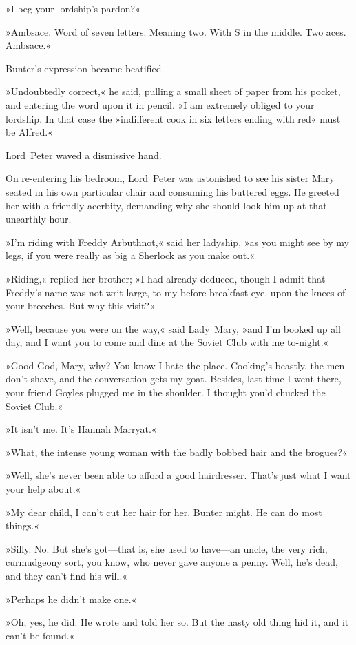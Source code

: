 »I beg your lordship's pardon?«

»Ambsace. Word of seven letters. Meaning two. With S in the middle. Two aces. Ambsace.«

Bunter's expression became beatified.

»Undoubtedly correct,« he said, pulling a small sheet of paper from his pocket, and entering the word upon it in pencil. »I am extremely obliged to your lordship. In that case the »indifferent cook in six letters ending with red« must be Alfred.«

Lord~Peter waved a dismissive hand.

\divider
On re-entering his bedroom, Lord~Peter was astonished to see his sister Mary seated in his own particular chair and consuming his buttered eggs. He greeted her with a friendly acerbity, demanding why she should look him up at that unearthly hour.

»I'm riding with Freddy Arbuthnot,« said her ladyship, »as you might see by my legs, if you were really as big a Sherlock as you make out.«

»Riding,« replied her brother; »I had already deduced, though I admit that Freddy's name was not writ large, to my before-breakfast eye, upon the knees of your breeches. But why this visit?«

»Well, because you were on the way,« said Lady~Mary, »and I'm booked up all day, and I want you to come and dine at the Soviet Club with me to-night.«

»Good God, Mary, why? You know I hate the place. Cooking's beastly, the men don't shave, and the conversation gets my goat. Besides, last time I went there, your friend Goyles plugged me in the shoulder. I thought you'd chucked the Soviet Club.«

»It isn't me. It's Hannah Marryat.«

»What, the intense young woman with the badly bobbed hair and the brogues?«

»Well, she's never been able to afford a good hairdresser. That's just what I want your help about.«

»My dear child, I can't cut her hair for her. Bunter might. He can do most things.«

»Silly. No. But she's got—that is, she used to have—an uncle, the very rich, curmudgeony sort, you know, who never gave anyone a penny. Well, he's dead, and they can't find his will.«

»Perhaps he didn't make one.«

»Oh, yes, he did. He wrote and told her so. But the nasty old thing hid it, and it can't be found.«

